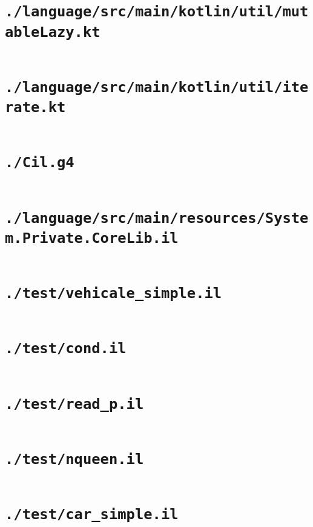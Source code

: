\documentclass[a4paper, 11pt]{report}
\begin{document}
    \section{\lstinline{./language/src/main/kotlin/util/mutableLazy.kt}}
    \inputminted{kotlin}{./language/src/main/kotlin/util/mutableLazy.kt}


    \section{\lstinline{./language/src/main/kotlin/util/iterate.kt}}
    \inputminted{kotlin}{./language/src/main/kotlin/util/iterate.kt}


    \section{\lstinline{./Cil.g4}}
    \inputminted{antlr}{./Cil.g4}


    \section{\lstinline{./language/src/main/resources/System.Private.CoreLib.il}}
    \inputminted{text}{./language/src/main/resources/System.Private.CoreLib.il}


    \section{\lstinline{./test/vehicale_simple.il}}
    \inputminted{text}{./test/vehicale_simple.il}


    \section{\lstinline{./test/cond.il}}
    \inputminted{text}{./test/cond.il}


    \section{\lstinline{./test/read_p.il}}
    \inputminted{text}{./test/read_p.il}


    \section{\lstinline{./test/nqueen.il}}
    \inputminted{text}{./test/nqueen.il}


    \section{\lstinline{./test/car_simple.il}}
    \inputminted{text}{./test/car_simple.il}
\end{document}
